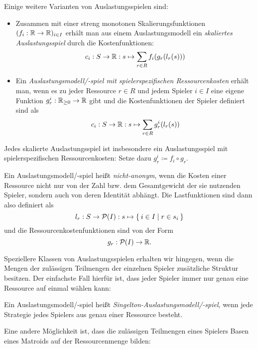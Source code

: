 Einige weitere Varianten von Auslastungsspielen sind:

\begin{defn}\label{def:weitereAuslastungsspiel}
	\begin{itemize}
		\item Zusammen mit einer streng monotonen Skalierungsfunktionen $(f_i: \mathbb{R} \to \mathbb{R})_{i\in I}$ erhält man aus einem Auslastungsmodell ein \emph{skaliertes Auslastungsspiel} durch die Kostenfunktionen:
			\[c_i: S \to \mathbb{R}: s \mapsto \sum_{r \in R} f_i(g_r(l_r(s))) \]
		\item Ein \emph{Auslastungsmodell/-spiel mit spielerspezifischen Ressourcenkosten} erhält man, wenn es zu jeder Ressource $r \in R$ und jedem Spieler $i \in I$ eine eigene Funktion $g_r^i: \mathbb{R}_{\geq 0} \to \mathbb{R}$ gibt und die Kostenfunktionen der Spieler definiert sind als
			\[c_i: S \to \mathbb{R}: s \mapsto \sum_{r \in R} g_r^i(l_r(s)) \]
	\end{itemize}
\end{defn}

\begin{bem}
	Jedes skalierte Auslastungsspiel ist insbesondere ein Auslastungsspiel mit spielerspezifischen Ressourcenkosten: Setze dazu $g_r^i \coloneqq f_i \circ g_r$.
\end{bem}

\begin{defn}
	Ein Auslastungsmodell/-spiel heißt \emph{nicht-anonym}, wenn die Kosten einer Ressource nicht nur von der Zahl bzw. dem Gesamtgewicht der sie nutzenden Spieler, sondern auch von deren Identität abhängt. Die Lastfunktionen sind dann also definiert als
		\[l_r: S \to \mathcal{P}(I): s \mapsto \Set{i \in I | r \in s_i }\]
	und die Ressourcenkostenfunktionen sind von der Form
		\[g_r: \mathcal{P}(I) \to \mathbb{R}. \]
\end{defn}

Speziellere Klassen von Auslastungsspielen erhalten wir hingegen, wenn die Mengen der zulässigen Teilmengen der einzelnen Spieler zusätzliche Struktur besitzen. Der einfachste Fall hierfür ist, dass jeder Spieler immer nur genau eine Ressource auf einmal wählen kann:

\begin{defn}
	Ein Auslastungsmodell/-spiel heißt \emph{Singelton-Auslastungsmodell/-spiel}, wenn jede Strategie jedes Spielers aus genau einer Ressource besteht.
\end{defn}

Eine andere Möglichkeit ist, dass die zulässigen Teilmengen eines Spielers Basen eines Matroids auf der Ressourcenmenge bilden:

